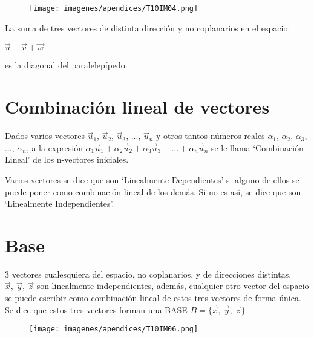 \begin{multicols}{2}
	\begin{figure}[H]
	\centering
	\texttt{[image: imagenes/apendices/T10IM04.png]}
	\end{figure}
	
	La suma de tres vectores de distinta dirección y no coplanarios en el espacio: 
	
	\centerline{$\vec u+\vec v+\vec w$} 
	
	es la diagonal del paralelepípedo.
\end{multicols}

\vspace{-5mm} \section{Combinación lineal de vectores}

	Dados varios vectores $\vec u_1$, $\vec u_2$, $\vec u_3$, ..., $\vec u_n$ y otros tantos números reales $\alpha_1$, $\alpha_2$, $\alpha_3$, ..., $\alpha_n$, a la expresión $\alpha_1 \vec u_1+\alpha_2 \vec u_2+\alpha_3 \vec u_3+...+\alpha_n \vec u_n$ se le llama `Combinación Lineal' de los n-vectores iniciales.
		
		
	Varios vectores se dice que son `Linealmente Dependientes'  si alguno de ellos se puede poner como combinación lineal de los demás. Si no es así, se dice que son `Linealmente Independientes'.
	

\section{Base}

\begin{multicols}{2}
	3 vectores cualesquiera del espacio, no coplanarios, y de direcciones distintas, $\vec x,\ \vec y, \ \vec z$ son linealmente independientes, además, cualquier otro vector del espacio se puede escribir como combinación lineal de estos tres vectores de forma única. Se dice que estos tres vectores forman una BASE $B=\{\vec x,\ \vec y, \ \vec z\}$
	\begin{figure}[H]
	\centering
	\texttt{[image: imagenes/apendices/T10IM06.png]}
	\end{figure}
\end{multicols}

\vspace{30mm} %

